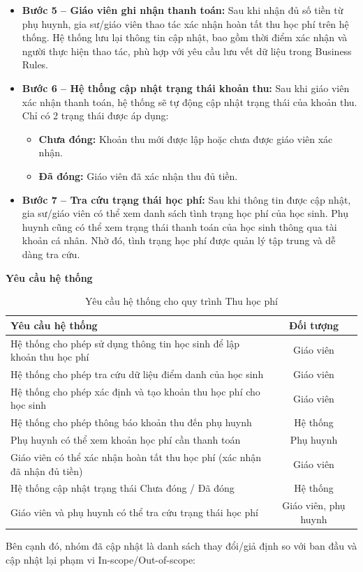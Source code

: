 \begin{itemize}
    \item \textbf{Bước 5 – Giáo viên ghi nhận thanh toán:} 
    Sau khi nhận đủ số tiền từ phụ huynh, gia sư/giáo viên thao tác xác nhận hoàn tất thu học phí trên hệ thống. Hệ thống lưu lại thông tin cập nhật, bao gồm thời điểm xác nhận và người thực hiện thao tác, phù hợp với yêu cầu lưu vết dữ liệu trong Business Rules.
    
    \item \textbf{Bước 6 – Hệ thống cập nhật trạng thái khoản thu:} 
    Sau khi giáo viên xác nhận thanh toán, hệ thống sẽ tự động cập nhật trạng thái của khoản thu. Chỉ có 2 trạng thái được áp dụng:
    \begin{itemize}
        \item \textbf{Chưa đóng:} Khoản thu mới được lập hoặc chưa được giáo viên xác nhận.
        \item \textbf{Đã đóng:} Giáo viên đã xác nhận thu đủ tiền.
    \end{itemize}
    
    \item \textbf{Bước 7 – Tra cứu trạng thái học phí:} 
    Sau khi thông tin được cập nhật, gia sư/giáo viên có thể xem danh sách tình trạng học phí của học sinh. Phụ huynh cũng có thể xem trạng thái thanh toán của học sinh thông qua tài khoản cá nhân. Nhờ đó, tình trạng học phí được quản lý tập trung và dễ dàng tra cứu.
\end{itemize}
\newpage
\noindent \textbf{Yêu cầu hệ thống}
\begin{table}[H]
    \centering
    \caption{Yêu cầu hệ thống cho quy trình Thu học phí}
    \renewcommand{\arraystretch}{1.5}
    \begin{tabular}{|p{8cm}|c|}
        \hline
        \textbf{Yêu cầu hệ thống} & \textbf{Đối tượng} \\ \hline
        Hệ thống cho phép sử dụng thông tin học sinh để lập khoản thu học phí & Giáo viên \\ \hline
        Hệ thống cho phép tra cứu dữ liệu điểm danh của học sinh & Giáo viên \\ \hline
        Hệ thống cho phép xác định và tạo khoản thu học phí cho học sinh & Giáo viên \\ \hline
        Hệ thống cho phép thông báo khoản thu đến phụ huynh & Hệ thống \\ \hline
        Phụ huynh có thể xem khoản học phí cần thanh toán & Phụ huynh \\ \hline
        Giáo viên có thể xác nhận hoàn tất thu học phí (xác nhận đã nhận đủ tiền) & Giáo viên \\ \hline
        Hệ thống cập nhật trạng thái Chưa đóng / Đã đóng & Hệ thống \\ \hline
        Giáo viên và phụ huynh có thể tra cứu trạng thái học phí & Giáo viên, phụ huynh \\ \hline
    \end{tabular}
\end{table}
Bên cạnh đó, nhóm đã cập nhật là danh sách thay đổi/giả định so với ban đầu và cập nhật lại phạm vi In-scope/Out-of-scope:
